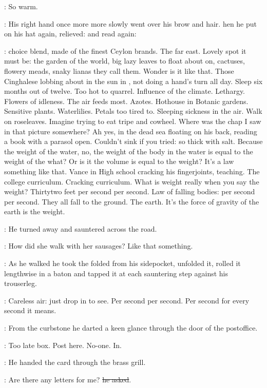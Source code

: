 \BloomInt:
So warm.

:
His right hand once more more slowly went over his brow and hair. 
hen he put on his hat again, relieved:
and read again:

\BloomInt:
choice blend, made of the finest Ceylon brands.
The far east.
Lovely spot it must be:
the garden of the world,
big lazy leaves to float about on,
cactuses, flowery meads,
snaky lianas they call them.
Wonder is it like that.
Those Cinghalese lobbing about in the sun in ,
not doing a hand's turn all day.
Sleep six months out of twelve.
Too hot to quarrel.
Influence of the climate.
Lethargy.
Flowers of idleness.
The air feeds most.
Azotes.
Hothouse in Botanic gardens.
Sensitive plants.
Waterlilies.
Petals too tired to.
Sleeping sickness in the air.
Walk on roseleaves.
Imagine trying to eat tripe and cowheel.
Where was the chap I saw in that picture somewhere?
Ah yes, in the dead sea floating on his back,
reading a book with a parasol open.
Couldn't sink if you tried:
so thick with salt.
Because the weight of the water,
no, the weight of the body in the water
is equal to the weight of the what?
Or is it the volume
is equal to the weight?
It's a law something like that.
Vance in High school cracking his fingerjoints, teaching.
The college curriculum.
Cracking curriculum.
What is weight really when you say the weight?
Thirtytwo feet per second per second.
Law of falling bodies:
per second per second.
They all fall to the ground.
The earth.
It's the force of gravity of the earth
is the weight.

:
He turned away and sauntered across the road.

\BloomInt:
How did she walk with her sausages?
Like that something.

:
As he walked he took the folded  from his sidepocket,
unfolded it, rolled it lengthwise in a baton
and tapped it at each sauntering step against his trouserleg.

\BloomInt:
Careless air: just drop in to see.
Per second per second.
Per second for every second
it means.

:
From the curbstone
he darted a keen glance through the door of the postoffice.

\BloomInt:
Too late box.
Post here.
No-one.
In.

:
He handed the card through the brass grill.

\Bloom:
Are there any letters for me?
\sout{he asked}.

